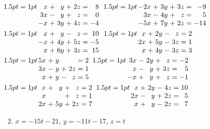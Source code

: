 \begin{multicols}{2}
\begin{ex}
\begin{exenumerate}
\exitem 
$\arraycolsep=1pt
\begin{array}[t]{rlrlrcr}
	 x & + &  y & + & 2z & = & 8 \\
	3x & - &  y & + &  z & = & 0 \\
	-x & + & 3y & + & 4z & = & -4 \\
\end{array}$
\exitem %
$\arraycolsep=1pt
\begin{array}[t]{rlrlrcr}
	-2x & + & 3y & + & 3z & = & -9 \\
	 3x & - & 4y & + &  z & = & 5 \\
	-5x & + & 7y & + & 2z & = & -14
\end{array}$
\exitem %
$\arraycolsep=1pt
\begin{array}[t]{rlrlrcr}
	 x & + &  y & - &  z & = & 10\\
	-x & + & 4y & + & 5z & = & -5 \\
	 x & + & 6y & + & 3z & = & 15
\end{array}$
\exitem %
$\arraycolsep=1pt
\begin{array}[t]{rlrlrcr}
	 x & + & 2y & - &  z & = & 2 \\
	2x & + & 5y & - & 3z & = & 1 \\
	 x & + & 4y & - & 3z & = & 3
\end{array}$
\exitem %
$\arraycolsep=1pt
\begin{array}[t]{rlrlrcr}
	5x & + & y &   &   & = & 2 \\
	3x & - & y & + & 2z& = & 1 \\
	 x & + & y & - & z & = & 5 
\end{array}$
\exitem %
$\arraycolsep=1pt
\begin{array}[t]{rlrlrcr}
	3x & - & 2y & + & z & = & -2 \\
 	 x & - & y & + & 3z & = & 5 \\
	-x & + & y & + & z & = & -1
\end{array}$
\exitem %
$\arraycolsep=1pt
\begin{array}[t]{rlrlrcr}
	 x & + & y & + & z & = & 2 \\
	 x &  &    & + & z & = & 1 \\
	2x & + & 5y & + & 2z & = & 7
\end{array}$
\exitem %
$\arraycolsep=1pt
\begin{array}[t]{rlrlrcr}
	 x & + & 2y& - & 4z & = & 10 \\
	2x & - & y & + & 2z & = & 5 \\
	 x & + & y & - & 2z & = & 7	
\end{array}$
\end{exenumerate}
\begin{sol}
\begin{enumerate}[label={\alph*.}]
\setcounter{enumi}{1}
\item  $x = -15t - 21$, $y = -11t - 17$, $z = t$


\end{enumerate}
\end{sol}
\end{ex}
\end{multicols}
